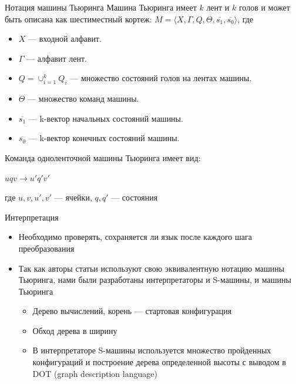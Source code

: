 \documentclass[xcolor=table]{beamer}
\begin{document}
\begin{frame}[fragile]{Нотация машины Тьюринга}
Машина Тьюринга имеет $ k $ лент и $ k $ голов и может быть описана как шестиместный кортеж:
$M = \langle X, \Gamma, Q, \Theta, \overline{s_1}, \overline{s_0} \rangle$,
где
\begin{itemize}
    \item $X$ --- входной алфавит.
    \item $\Gamma$ --- алфавит лент.
    \item $Q = \cup_{i=1}^k Q_i$ --- множество состояний голов на лентах машины.
    \item $\Theta$ --- множество команд машины.
    \item $\overline{s_1}$ --- k-вектор начальных состояний машины.
    \item $\overline{s_0}$ --- k-вектор конечных состояний машины.
\end{itemize}

Команда одноленточной машины Тьюринга имеет вид: 
\begin{center}
    $u q v \to u' q' v'$
\end{center}
где $u, v, u', v'$ --- ячейки, $q, q'$ --- состояния

\end{frame}

\begin{frame}[fragile]{Интерпретация}
\begin{itemize}
    \item Необходимо проверять, сохраняется ли язык после каждого шага преобразования
    \item Так как авторы статьи используют свою эквивалентную нотацию машины Тьюринга, нами были разработаны интерпретаторы и S-машины, и машины Тьюринга 
    \begin{itemize}
        \item Дерево вычислений, корень --- стартовая конфигурация
        \item Обход дерева в ширину
        \item В интерпретаторе S-машины используется множество пройденных конфигураций и построение дерева определенной высоты с выводом в DOT (graph description language)
    \end{itemize}
\end{itemize}
\end{frame}
\end{document}
